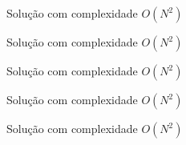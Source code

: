 \begin{frame}[fragile]{Solução com complexidade $O(N^2)$}
\end{frame}

\begin{frame}[fragile]{Solução com complexidade $O(N^2)$}
\end{frame}

\begin{frame}[fragile]{Solução com complexidade $O(N^2)$}
\end{frame}

\begin{frame}[fragile]{Solução com complexidade $O(N^2)$}
\end{frame}

\begin{frame}[fragile]{Solução com complexidade $O(N^2)$}
\end{frame}
